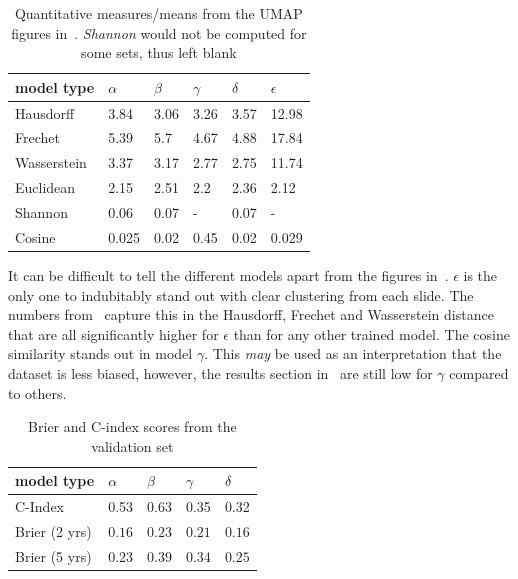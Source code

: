 \documentclass[10pt,twocolumn,letterpaper]{article}
\begin{document}
\begin{table}
\centering
  \begin{tabular}{|l l l l l l|}
    \hline 
    model type & $\alpha$ & $\beta$ & $\gamma$ & $\delta$ & $\epsilon$ \\
    \hline 
    Hausdorff & 3.84 & 3.06 & 3.26 & 3.57 & 12.98 \\
    Frechet & 5.39 & 5.7 & 4.67 & 4.88 & 17.84 \\
    Wasserstein & 3.37 & 3.17 & 2.77 & 2.75 & 11.74 \\
    \hline
    Euclidean & 2.15 & 2.51 & 2.2  & 2.36 & 2.12  \\
    Shannon & 0.06 & 0.07 & - & 0.07 & - \\
    Cosine & 0.025 & 0.02 & 0.45 & 0.02 & 0.029  \\
    \hline
  \end{tabular}
  \caption{Quantitative measures/means from the \gls{UMAP} figures in~. \textit{Shannon} would not be computed for some sets, thus left blank}
  \label{tab:quantitativeres}
\end{table}

It can be difficult to tell the different models apart from the figures in~. $\epsilon$ is the only one to indubitably stand out with clear clustering from each slide. The numbers from~ capture this in the Hausdorff, Frechet and Wasserstein distance that are all significantly higher for $\epsilon$ than for any other trained model. The cosine similarity stands out in model $\gamma$. This \textit{may} be used as an interpretation that the dataset is less biased, however, the results section in~ are still low for $\gamma$ compared to others. 


\begin{table}
\centering
  \begin{tabular}{l l l l l}
    model type & $\alpha$ & $\beta$ & $\gamma$ & $\delta$ \\
    \hline
    C-Index & 0.53 & 0.63 & 0.35 & 0.32 \\
    Brier (2 yrs) & $0.16$ & $0.23$ & $0.21$ & $0.16$  \\
    Brier (5 yrs) & $0.23$ & $0.39$ & $0.34$ & $0.25$  \\
    \hline
  \end{tabular}
  \caption{Brier and C-index scores from the validation set}
  \label{tab:combinedres}
\end{table}
\end{document}

